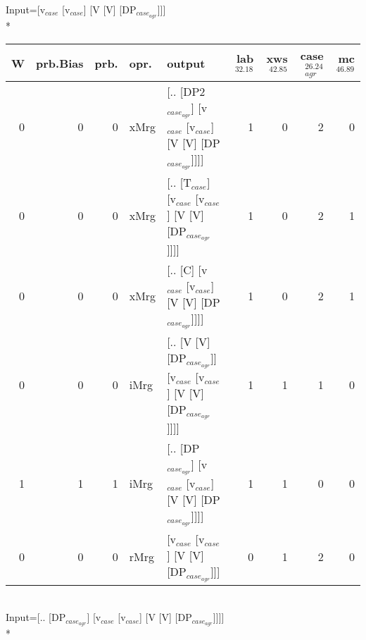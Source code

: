 \begingroup\scriptsize Input=[v$_{case}$ [v$_{case}$] [V [V] [DP$_{case_{agr}}$]]]\\*
\begin{tabularx}{\linewidth}{rrrlXrrrr}
\hline
   W &   prb.Bias &   prb. & opr.   & output                                                             &   lab$^{32.18}$ &   xws$^{42.85}$ &   case$_{agr}^{26.24}$ &   mc$^{46.89}$ \\
\hline
   0 &       0 &   0 & xMrg & [.. [DP2$_{case_{agr}}$] [v$_{case}$ [v$_{case}$] [V [V] [DP$_{case_{agr}}$]]]]        &             1 &             0 &                  2 &            0 \\
   0 &       0 &   0 & xMrg & [.. [T$_{case}$] [v$_{case}$ [v$_{case}$] [V [V] [DP$_{case_{agr}}$]]]]              &             1 &             0 &                  2 &            1 \\
   0 &       0 &   0 & xMrg & [.. [C] [v$_{case}$ [v$_{case}$] [V [V] [DP$_{case_{agr}}$]]]]                   &             1 &             0 &                  2 &            1 \\
   0 &       0 &   0 & iMrg & [.. [V [V] [DP$_{case_{agr}}$]] [v$_{case}$ [v$_{case}$] [V [V] [DP$_{case_{agr}}$]]]] &             1 &             1 &                  1 &            0 \\
   1 &       1 &   1 & iMrg & [.. [DP$_{case_{agr}}$] [v$_{case}$ [v$_{case}$] [V [V] [DP$_{case_{agr}}$]]]]         &             1 &             1 &                  0 &            0 \\
   0 &       0 &   0 & rMrg & [v$_{case}$ [v$_{case}$] [V [V] [DP$_{case_{agr}}$]]]                            &             0 &             1 &                  2 &            0 \\
\hline
\end{tabularx}\endgroup\\
\begingroup\scriptsize Input=[.. [DP$_{case_{agr}}$] [v$_{case}$ [v$_{case}$] [V [V] [DP$_{case_{agr}}$]]]]\\*
